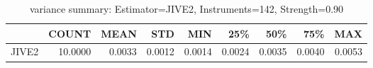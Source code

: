 \begin{table}[ht]
\centering
\caption{variance summary: Estimator=JIVE2, Instruments=142, Strength=0.90}
\begin{tabular}{lrrrrrrrr}
\toprule
 & COUNT & MEAN & STD & MIN & 25\% & 50\% & 75\% & MAX \\
\midrule
JIVE2 & 10.0000 & 0.0033 & 0.0012 & 0.0014 & 0.0024 & 0.0035 & 0.0040 & 0.0053 \\
\bottomrule
\end{tabular}
\end{table}
